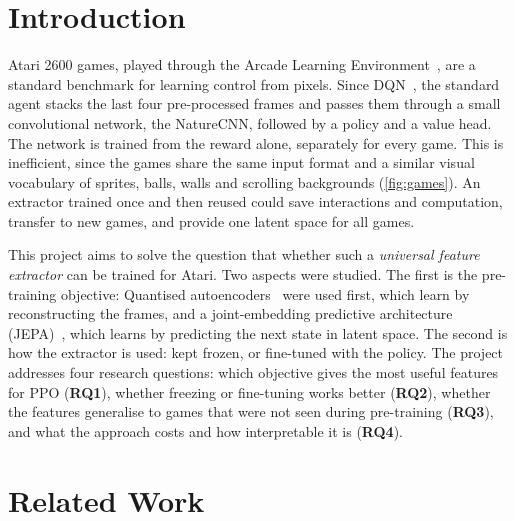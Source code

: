 \documentclass[runningheads]{llncs}
\begin{document}
\section{Introduction}
\label{sec:intro}

Atari 2600 games, played through the Arcade Learning Environment~\cite{machado2018revisiting},
are a standard benchmark for learning control from pixels. Since
DQN~\cite{mnih2015human}, the standard agent stacks the last four pre-processed frames and
passes them through a small convolutional network, the NatureCNN, followed by a policy and a
value head. The network is trained from the reward alone, separately for every game. This is
inefficient, since the games share the same input
format and a similar visual vocabulary of sprites, balls, walls and scrolling backgrounds
(\cref{fig:games}). An extractor trained once and then reused could save interactions and computation,
transfer to new games, and provide one latent space for all games.

This project aims to solve the question that whether such a \emph{universal feature
extractor} can be trained for Atari. Two aspects were studied. The first is the pre-training objective: Quantised
autoencoders~\cite{vandenoord2017vqvae,mentzer2024fsq} were used first, which learn by reconstructing the
frames, and a joint-embedding predictive architecture
(JEPA)~\cite{lecun2022path,assran2023ijepa,bardes2024vjepa}, which learns by predicting the
next state in latent space. The second is how the extractor is used: kept frozen, or fine-tuned with the policy. The
project addresses four research questions: which objective gives the most useful features for PPO (\textbf{RQ1}), whether
freezing or fine-tuning works better (\textbf{RQ2}), whether the features generalise to games
that were not seen during pre-training (\textbf{RQ3}), and what the approach costs and
how interpretable it is (\textbf{RQ4}).

\section{Related Work}
\label{sec:related}
\end{document}
